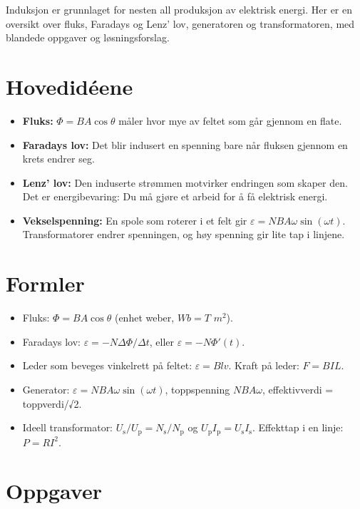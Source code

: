 \documentclass[11pt]{article}
\begin{document}

Induksjon er grunnlaget for nesten all produksjon av elektrisk energi. Her er en oversikt over fluks, Faradays og Lenz' lov, generatoren og transformatoren, med blandede oppgaver og løsningsforslag.

\section*{Hovedidéene}

\begin{itemize}
\item \textbf{Fluks:} $Φ = BA \cos  θ$ måler hvor mye av feltet som går gjennom en flate.
\item \textbf{Faradays lov:} Det blir indusert en spenning bare når fluksen gjennom en krets endrer seg.
\item \textbf{Lenz' lov:} Den induserte strømmen motvirker endringen som skaper den. Det er energibevaring: Du må gjøre et arbeid for å få elektrisk energi.
\item \textbf{Vekselspenning:} En spole som roterer i et felt gir $ε = NBAω \sin (ωt)$. Transformatorer endrer spenningen, og høy spenning gir lite tap i linjene.
\end{itemize}

\section*{Formler}

\begin{itemize}
\item Fluks: $Φ = BA \cos  θ$ (enhet weber, $Wb = T$ $m^{2}$).
\item Faradays lov: $ε = -NΔΦ/Δt$, eller $ε = -NΦ′(t)$.
\item Leder som beveges vinkelrett på feltet: $ε = Blv$. Kraft på leder: $F = BIL$.
\item Generator: $ε = NBAω \sin (ωt)$, toppspenning $NBAω$, effektivverdi = toppverdi/√2.
\item Ideell transformator: $U_{\mathrm{s}}/U_{\mathrm{p}} = N_{\mathrm{s}}/N_{\mathrm{p}}$ og $U_{\mathrm{p}}I_{\mathrm{p}} = U_{\mathrm{s}}I_{\mathrm{s}}$. Effekttap i en linje: $P = RI^{2}$.
\end{itemize}

\section*{Oppgaver}
\end{document}
